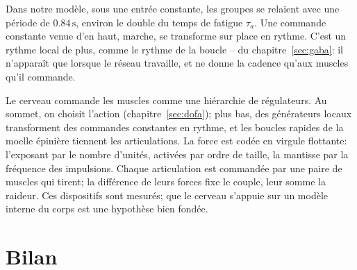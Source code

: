 Dans notre modèle, sous une entrée constante, les groupes se relaient avec une période de $0.84\,\text{s}$, environ le double du temps de fatigue $\tau_a$. Une commande constante venue d'en haut, \og marche\fg{}, se transforme sur place en rythme. C'est un rythme local de plus, comme le rythme de la boucle -- du chapitre~\ref{sec:gaba}: il n'apparaît que lorsque le réseau travaille, et ne donne la cadence qu'aux muscles qu'il commande.

\begin{keyblock}
\begin{proposition}
\label{prop:muscles}
Le cerveau commande les muscles comme une hiérarchie de régulateurs. Au sommet, on choisit l'action (chapitre~\ref{sec:dofa}); plus bas, des générateurs locaux transforment des commandes constantes en rythme, et les boucles rapides de la moelle épinière tiennent les articulations. La force est codée en virgule flottante: l'exposant par le nombre d'unités, activées par ordre de taille, la mantisse par la fréquence des impulsions. Chaque articulation est commandée par une paire de muscles qui tirent; la différence de leurs forces fixe le couple, leur somme la raideur. Ces dispositifs sont mesurés; que le cerveau s'appuie sur un modèle interne du corps est une hypothèse bien fondée.
\end{proposition}
\end{keyblock}

\section{Bilan}

